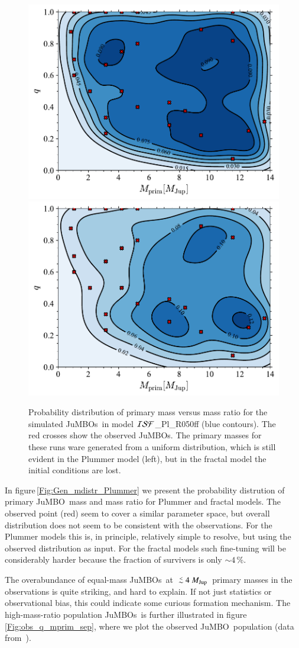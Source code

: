 \documentclass[submission,phys]{lib/SciPost}
\newcommand{\MJup}{\mbox{${M}_{\rm Jup}$}}
\def\aplt{\ {\raise-.5ex\hbox{$\buildrel<\over\sim$}}\ }
\newcommand{\jumbo}{\mbox{JuMBO}}
\newcommand{\jumbos}{\mbox{JuMBOs}}
\begin{document}
\begin{figure}
    \centering
    \includegraphics[width=0.49\columnwidth]{figures/Plummer_rvir0.5_FF_mass_distr.pdf}
    \includegraphics[width=0.49\columnwidth]{figures/Fractal_rvir0.5_FF_mass_distr.pdf}
    \caption{Probability distribution of primary mass versus mass
      ratio for the simulated \jumbos\, in model ${\cal
        ISF}$\_Pl\_R050ff (blue contours).  The red crosses show the
      observed \jumbos.  The primary masses for these runs ware
      generated from a uniform distribution, which is still evident in
      the Plummer model (left), but in the fractal model the initial
      conditions are lost.  }
         \label{Fig:Gen_mdistr_Plummer}
         \label{Fig:Gen_mdistr_Fractal}
\end{figure}

In figure\,\ref{Fig:Gen_mdistr_Plummer} we present the probability
distrution of primary \jumbo\, mass and mass ratio for Plummer and
fractal models.  The observed point (red) seem to cover a similar
parameter space, but overall distribution does not seem to be
consistent with the observations. For the Plummer models this is, in
principle, relatively simple to resolve, but using the observed
distribution as input. For the fractal models such fine-tuning will be
considerably harder because the fraction of survivers is only $\sim
4$\,\%.

The overabundance of equal-mass \jumbos\, at $\aplt 4$\,\MJup\,
primary masses in the observations is quite striking, and hard to
explain. If not just statistics or observational bias, this could
indicate some curious formation mechanism. The high-mass-ratio
population \jumbos\, is further illustrated in
figure\,\ref{Fig:obs_q_mprim_sep}, where we plot the observed \jumbo\,
population (data from \,\cite{2023arXiv231001231P}).
\end{document}
